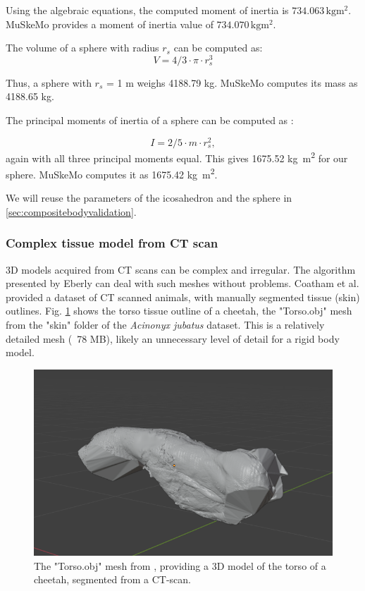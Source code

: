 \documentclass{article}
\begin{document}
Using the algebraic equations, the computed moment of inertia is \(734.063 \, \si{\kilogram \metre^2}\). MuSkeMo provides a moment of inertia value of \(734.070 \, \si{\kilogram \metre^2}\).

The volume of a sphere with radius \(r_{s}\) can be computed as:
\begin{equation}
V = 4/3 \cdot \pi \cdot  r_{s}^3
\end{equation}


Thus, a sphere with \(r_{s}\) = 1 \si{m} weighs 4188.79 \si{kg}. MuSkeMo computes its mass as 4188.65 \si{kg}.

The principal moments of inertia of a sphere can be computed as \cite{ruinaMechanicsToolsetStatics2019}:

\begin{equation}
I = 2/5 \cdot m \cdot  r_{s}^2,
\end{equation}
again with all three principal moments equal. This gives 1675.52 \si{\kilogram \metre^2} for our sphere. MuSkeMo computes it as 1675.42 \si{\kilogram \metre^2}.

We will reuse the parameters of the icosahedron and the sphere in \ref{sec:compositebodyvalidation}.

\subsubsection*{Complex tissue model from CT scan}

3D models acquired from CT scans can be complex and irregular. The algorithm presented by Eberly \cite{eberlyGamePhysics2004} can deal with such meshes without problems. Coatham et al. \cite{coathamConvexHullEstimation2021} provided a dataset of CT scanned animals, with manually segmented tissue (skin) outlines. Fig. \ref{fig:cheetahhull} shows the torso tissue outline of a cheetah, the "Torso.obj" mesh from the "skin" folder of the \textit{Acinonyx jubatus} dataset. This is a relatively detailed mesh (~78 MB), likely an unnecessary level of detail for a rigid body model.

\begin{figure}[htbp]
    \centering
    \includegraphics[width=\textwidth]{figures/cheetah_hull.png} %
    \caption{The "Torso.obj" mesh from \cite{coathamConvexHullEstimation2021}, providing a 3D model of the torso of a cheetah, segmented from a CT-scan.}
    \label{fig:cheetahhull}
\end{figure}
\end{document}
